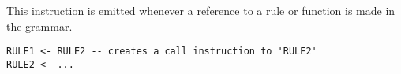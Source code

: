 This instruction is emitted whenever a reference to
a rule or function is made in the grammar.

\begin{myquote}
\begin{verbatim}
RULE1 <- RULE2 -- creates a call instruction to 'RULE2'
RULE2 <- ...
\end{verbatim}
\end{myquote}

